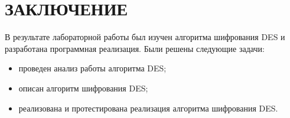 \chapter*{ЗАКЛЮЧЕНИЕ}

В результате лабораторной работы был изучен алгоритма шифрования DES и разработана программная реализация. Были решены следующие задачи:

\begin{itemize}[label=---]
	\item проведен анализ работы алгоритма DES;
	\item описан алгоритм шифрования DES;
    \item реализована и протестирована реализация алгоритма шифрования DES.
\end{itemize}
